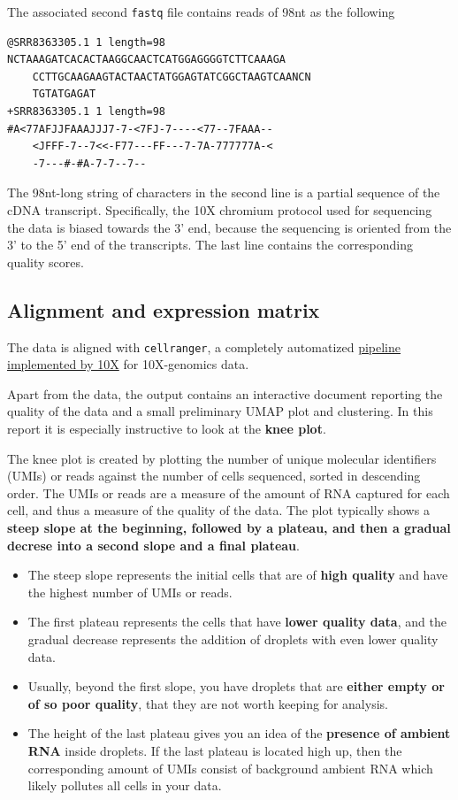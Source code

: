 \documentclass[
  letterpaper,
  DIV=11,
  numbers=noendperiod]{scrartcl}
\providecommand{\tightlist}{%
  \setlength{\itemsep}{0pt}\setlength{\parskip}{0pt}}\usepackage{longtable,booktabs,array}
\begin{document}
The associated second \texttt{fastq} file contains reads of 98nt as the
following

\begin{verbatim}
@SRR8363305.1 1 length=98
NCTAAAGATCACACTAAGGCAACTCATGGAGGGGTCTTCAAAGA
    CCTTGCAAGAAGTACTAACTATGGAGTATCGGCTAAGTCAANCN
    TGTATGAGAT
+SRR8363305.1 1 length=98
#A<77AFJJFAAAJJJ7-7-<7FJ-7----<77--7FAAA--
    <JFFF-7--7<<-F77---FF---7-7A-777777A-<
    -7---#-#A-7-7--7--
\end{verbatim}

The 98nt-long string of characters in the second line is a partial
sequence of the cDNA transcript. Specifically, the 10X chromium protocol
used for sequencing the data is biased towards the 3' end, because the
sequencing is oriented from the 3' to the 5' end of the transcripts. The
last line contains the corresponding quality scores.

\hypertarget{alignment-and-expression-matrix}{%
\subsection{Alignment and expression
matrix}\label{alignment-and-expression-matrix}}

The data is aligned with \texttt{cellranger}, a completely automatized
\href{https://support.10xgenomics.com/single-cell-gene-expression/software/pipelines/latest/what-is-cell-ranger}{pipeline
implemented by 10X} for 10X-genomics data.

Apart from the data, the output contains an interactive document
reporting the quality of the data and a small preliminary UMAP plot and
clustering. In this report it is especially instructive to look at the
\textbf{knee plot}.

The knee plot is created by plotting the number of unique molecular
identifiers (UMIs) or reads against the number of cells sequenced,
sorted in descending order. The UMIs or reads are a measure of the
amount of RNA captured for each cell, and thus a measure of the quality
of the data. The plot typically shows a \textbf{steep slope at the
beginning, followed by a plateau, and then a gradual decrese into a
second slope and a final plateau}.

\begin{itemize}
\tightlist
\item
  The steep slope represents the initial cells that are of \textbf{high
  quality} and have the highest number of UMIs or reads.
\item
  The first plateau represents the cells that have \textbf{lower quality
  data}, and the gradual decrease represents the addition of droplets
  with even lower quality data.
\item
  Usually, beyond the first slope, you have droplets that are
  \textbf{either empty or of so poor quality}, that they are not worth
  keeping for analysis.
\item
  The height of the last plateau gives you an idea of the
  \textbf{presence of ambient RNA} inside droplets. If the last plateau
  is located high up, then the corresponding amount of UMIs consist of
  background ambient RNA which likely pollutes all cells in your data.
\end{itemize}
\end{document}
